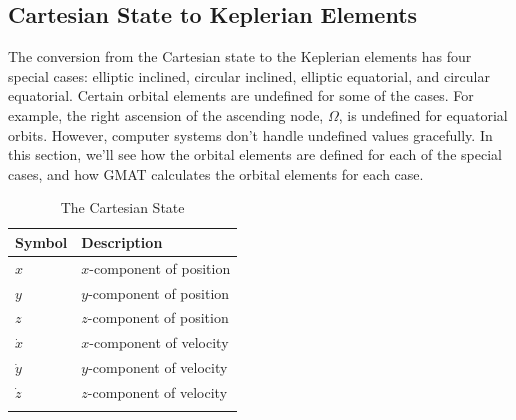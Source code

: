%

\subsection{Cartesian State to Keplerian Elements}\label{Sec:Cart2Kep}   

The conversion from the Cartesian state to the Keplerian elements
has four special cases:  elliptic inclined, circular inclined,
elliptic equatorial, and circular equatorial.  Certain orbital
elements are undefined for some of the cases.  For example, the
right ascension of the ascending node, $\Omega$, is undefined for
equatorial orbits.  However, computer systems don't handle undefined
values gracefully.  In this section, we'll see how the orbital
elements are defined for each of the special cases, and how GMAT
calculates the orbital elements for each case\cite{Vallado:01}.

%
\begin{table} \caption{The Cartesian State}
\centering {}
\begin{tabular}{p{.5 in} p{2.0 in}}
  \hline\hline
   Symbol &  Description \\
  \hline
  $x$ &  $x$-component of position\\
%
  $y$ &  $y$-component of position \\
  $z$ &  $z$-component of position \\
  $\dot{x}$ &  $x$-component of velocity\\
  $\dot{y}$ & $y$-component of velocity\\
  $\dot{z}$ & $z$-component of velocity \\
  \hline\hline \label{Table:CartesianStates}
\end{tabular}
\end{table}

